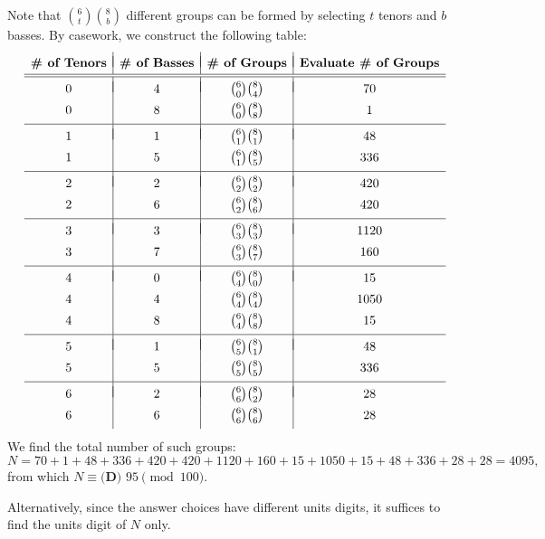 \begin{enumerate}
Note that $\binom{6}{t}\binom{8}{b}$ different groups can be formed by selecting $t$ tenors and $b$ basses. By casework, we construct the following table:
 \[\begin{array}{c|c|c|c} & & & \\ [-2ex] \textbf{\# of Tenors} & \textbf{\# of Basses} & \textbf{\# of Groups} & \textbf{Evaluate \# of Groups} \\ [0.5ex] \hline\hline  & & & \\ [-2ex] 0 & 4 & \tbinom{6}{0}\tbinom{8}{4} & 70 \\ [1ex] 0 & 8 & \tbinom{6}{0}\tbinom{8}{8} & 1 \\ [1ex] \hline & & & \\ [-2ex] 1 & 1 & \tbinom{6}{1}\tbinom{8}{1} & 48 \\ [1ex] 1 & 5 & \tbinom{6}{1}\tbinom{8}{5} & 336 \\ [1ex] \hline & & & \\ [-2ex] 2 & 2 & \tbinom{6}{2}\tbinom{8}{2} & 420 \\ [1ex] 2 & 6 & \tbinom{6}{2}\tbinom{8}{6} & 420 \\ [1ex] \hline & & & \\ [-2ex] 3 & 3 & \tbinom{6}{3}\tbinom{8}{3} & 1120 \\ [1ex] 3 & 7 & \tbinom{6}{3}\tbinom{8}{7} & 160 \\ [1ex] \hline & & & \\ [-2ex] 4 & 0 & \tbinom{6}{4}\tbinom{8}{0} & 15 \\ [1ex] 4 & 4 & \tbinom{6}{4}\tbinom{8}{4} & 1050 \\ [1ex] 4 & 8 & \tbinom{6}{4}\tbinom{8}{8} & 15 \\ [1ex] \hline & & & \\ [-2ex] 5 & 1 & \tbinom{6}{5}\tbinom{8}{1} & 48 \\ [1ex] 5 & 5 & \tbinom{6}{5}\tbinom{8}{5} & 336 \\ [1ex] \hline & & & \\ [-2ex] 6 & 2 & \tbinom{6}{6}\tbinom{8}{2} & 28 \\ [1ex] 6 & 6 & \tbinom{6}{6}\tbinom{8}{6} & 28 \\ [1ex] \end{array}\]We find the total number of such groups: 
 \[N=70+1+48+336+420+420+1120+160+15+1050+15+48+336+28+28=4095,\]from which $N\equiv\boxed{\textbf{(D) } 95}\pmod{100}.$

 Alternatively, since the answer choices have different units digits, it suffices to find the units digit of $N$ only.


\end{enumerate}
